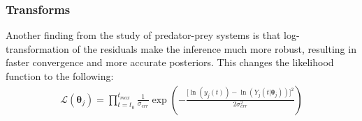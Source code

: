 \documentclass[11pt]{article}
\begin{document}
\subsubsection{Transforms}
Another finding from the study of predator-prey systems \cite{rosenbaum} is that log-transformation of the residuals make the inference much more robust, resulting in faster convergence and more accurate posteriors. This changes the likelihood function to the following:
\begin{align*}
    \mathcal{L}(\boldsymbol{\theta}_j) = \prod_{t=t_0}^{t_{max}} \frac{1}{\sigma_{err}} \exp\left(-\frac{\lbrack\ln(y_{j}(t)) - \ln(Y_j(t|\boldsymbol{\theta}_j))\rbrack^2}{2\sigma_{err}^2}\right)  
\end{align*}

\end{document}
